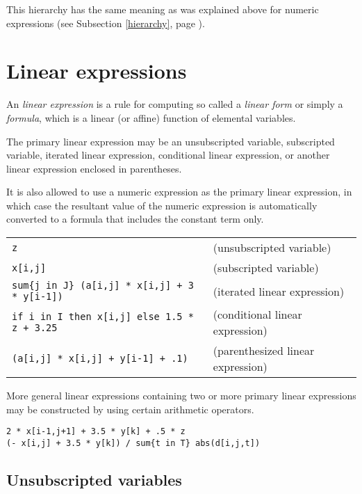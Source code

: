\documentclass[11pt]{report}
\def\para#1{\noindent{\bf#1}}
\begin{document}
This hierarchy has the same meaning as was explained above for numeric
expressions (see Subsection \ref{hierarchy}, page \pageref{hierarchy}).

\section{Linear expressions}

An {\it linear expression} is a rule for computing so called
a {\it linear form} or simply a {\it formula}, which is a linear (or
affine) function of elemental variables.

The primary linear expression may be an unsubscripted variable,
subscripted variable, iterated linear expression, conditional linear
expression, or another linear expression enclosed in parentheses.

It is also allowed to use a numeric expression as the primary linear
expression, in which case the resultant value of the numeric expression
is automatically converted to a formula that includes the constant term
only.

\para{Examples}

\noindent
\begin{tabular}{@{}ll@{}}
\verb|z| &(unsubscripted variable)\\
\verb|x[i,j]| &(subscripted variable)\\
\verb|sum{j in J} (a[i,j] * x[i,j] + 3 * y[i-1])| &
(iterated linear expression)\\
\verb|if i in I then x[i,j] else 1.5 * z + 3.25| &
(conditional linear expression)\\
\verb|(a[i,j] * x[i,j] + y[i-1] + .1)| &
(parenthesized linear expression)\\
\end{tabular}

More general linear expressions containing two or more primary linear
expressions may be constructed by using certain arithmetic operators.

\para{Examples}

\begin{verbatim}
2 * x[i-1,j+1] + 3.5 * y[k] + .5 * z
(- x[i,j] + 3.5 * y[k]) / sum{t in T} abs(d[i,j,t])
\end{verbatim}

\vspace*{-5pt}

\subsection{Unsubscripted variables}
\end{document}

